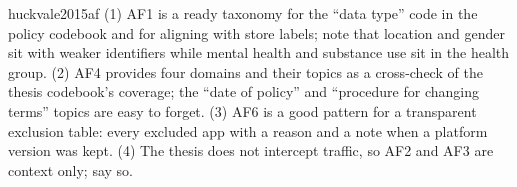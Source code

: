 \begin{papercard}{huckvale2015af}
 (1) AF1 is a ready taxonomy for the ``data type'' code in the policy codebook and for aligning with store labels; note that location and gender sit with weaker identifiers while mental health and substance use sit in the health group. (2) AF4 provides four domains and their topics as a cross-check of the thesis codebook's coverage; the ``date of policy'' and ``procedure for changing terms'' topics are easy to forget. (3) AF6 is a good pattern for a transparent exclusion table: every excluded app with a reason and a note when a platform version was kept. (4) The thesis does not intercept traffic, so AF2 and AF3 are context only; say so.
\end{papercard}
